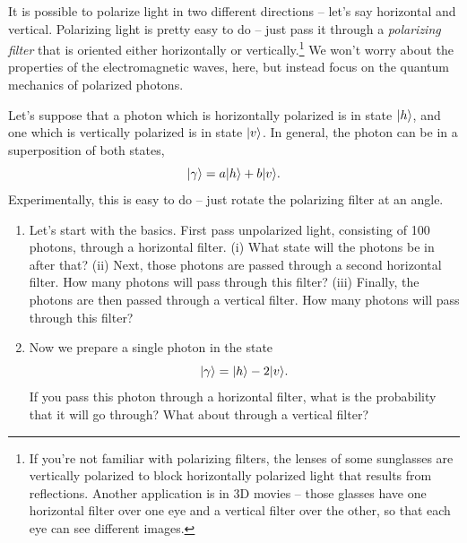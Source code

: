 \begin{problem}
\label{prob_polarization}

It is possible to polarize light in two different directions -- let's say horizontal and vertical. Polarizing light is pretty easy to do -- just pass it through a \emph{polarizing filter} that is oriented either horizontally or vertically.\footnote{If you're not familiar with polarizing filters, the lenses of some sunglasses are vertically polarized to block horizontally polarized light that results from reflections. Another application is in 3D movies -- those glasses have one horizontal filter over one eye and a vertical filter over the other, so that each eye can see different images.}   We won't worry about the properties of the electromagnetic waves, here, but instead focus on the quantum mechanics of polarized photons.  

Let's suppose that a photon which is horizontally polarized is in state $| h \rangle$, and one which is vertically polarized is in state $| v \rangle$.  In general, the photon can be in a superposition of both states,
\[
| \gamma \rangle = a | h \rangle + b | v \rangle.
\]
Experimentally, this is easy to do -- just rotate the polarizing filter at an angle.  

\begin{enumerate} [label=(\alph*)]

\item Let's start with the basics.  First pass unpolarized light, consisting of 100 photons, through a horizontal filter.  (i) What state will the photons be in after that?  (ii) Next, those photons are passed through a second horizontal filter.  How many photons will pass through this filter?  (iii) Finally, the photons are then passed through a vertical filter.  How many photons will pass through this filter?

\item Now we prepare a single photon in the state
\[
| \gamma \rangle = | h \rangle - 2 | v \rangle.
\]
If you pass this photon through a horizontal filter, what is the probability that it will go through?  What about through a vertical filter?


\end{enumerate}
\end{problem}
